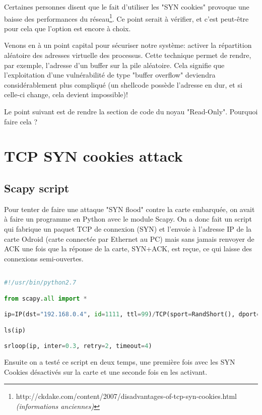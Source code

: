 Certaines personnes disent que le fait d'utiliser les "SYN cookies" provoque une baisse des performances du réseau\footnote{http://ckdake.com/content/2007/disadvantages-of-tcp-syn-cookies.html \textit{(informations anciennes)}}. Ce point serait à vérifier, et c'est peut-être pour cela que l'option est encore à choix.

Venons en à un point capital pour sécuriser notre système: activer la répartition aléatoire des adresses virtuelle des processus. 
Cette technique permet de rendre, par exemple, l'adresse d'un buffer sur la pile aléatoire. Cela signifie que l'exploitation d'une vulnérabilité de type "buffer overflow" deviendra considérablement plus compliqué (un shellcode possède l'adresse en dur, et si celle-ci change, cela devient impossible)! 

Le point suivant est de rendre la section de code du noyau "Read-Only". Pourquoi faire cela ? 


\section{TCP SYN cookies attack}
\subsection{Scapy script}

Pour tenter de faire une attaque "SYN flood" contre la carte embarquée, on avait à faire un programme en Python avec le module Scapy. On a donc fait un script qui fabrique un paquet TCP de connexion (SYN) et l'envoie à l'adresse IP de la carte Odroid (carte connectée par Ethernet au PC) mais sans jamais renvoyer de ACK une fois que la réponse de la carte, SYN+ACK, est reçue, ce qui laisse des connexions semi-ouvertes.\\

\begin{lstlisting}[frame=single,language=Python]  % Start your code-block

#!/usr/bin/python2.7

from scapy.all import *

ip=IP(dst="192.168.0.4", id=1111, ttl=99)/TCP(sport=RandShort(), dport=[22, 80], seq=12345, ack=1000, window=1000, flags="S")/""

ls(ip)

srloop(ip, inter=0.3, retry=2, timeout=4)
\end{lstlisting}

Ensuite on a testé ce script en deux temps, une première fois avec les SYN Cookies désactivés sur la carte et une seconde fois en les activant.\\

